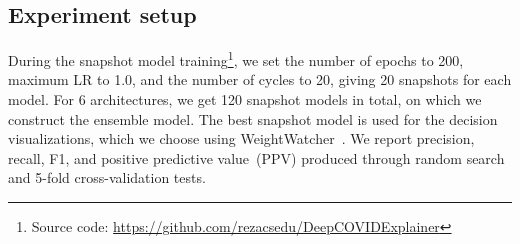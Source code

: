 \documentclass[conference]{IEEEtran}
\begin{document}
\subsection{Experiment setup}
During the snapshot model training\footnote{Source code: \url{https://github.com/rezacsedu/DeepCOVIDExplainer}}, we set the number of epochs to 200, maximum LR to 1.0, and the number of cycles to 20, giving 20 snapshots for each model. For 6 architectures, we get 120 snapshot models in total, on which we construct the ensemble model. The best snapshot model is used for the decision visualizations, which we choose using WeightWatcher~\cite{martin2019traditional}. 
We report precision, recall, F1, and positive predictive value~(PPV) produced through random search and 5-fold cross-validation tests. %
\end{document}
